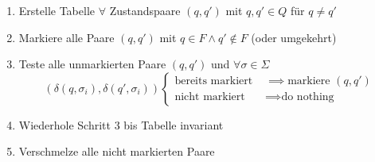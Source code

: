 \documentclass[a4paper,parskip=half,footsepline,headings=normal,titlepage=false]{scrartcl}
\begin{document}
\begin{enumerate}
	\item Erstelle Tabelle $\forall$ Zustandspaare $(q, q')$ mit $q, q' \in Q$ für $q \ne q'$
	\item Markiere alle Paare $(q, q')$ mit $q\in F \land q'\notin F$ (oder umgekehrt)
	\item Teste alle unmarkierten Paare $(q, q')$ und $\forall \sigma \in \Sigma$
		\[
			(\delta(q,\sigma_i), \delta(q',\sigma_i))
			\begin{cases}
				\text{bereits markiert } & \implies \text{markiere } (q, q') \\
				\text{nicht markiert } & \implies \text{do nothing}
			\end{cases}
		\]
	\item Wiederhole Schritt 3 bis Tabelle invariant
	\item Verschmelze alle nicht markierten Paare
\end{enumerate}
\end{document}
